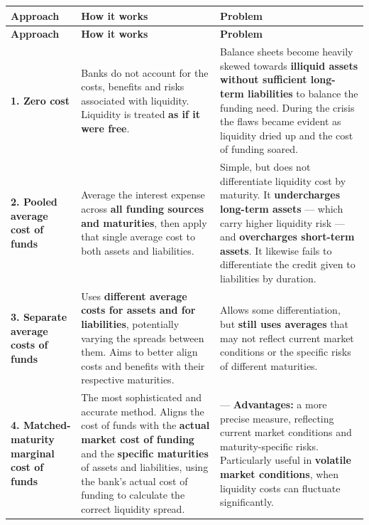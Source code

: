 \begin{center}
\scriptsize
\begin{longtable}{@{}p{3.4cm} p{5.7cm} p{5.2cm}@{}}
\toprule
\rowcolor{FRMSoft}\textbf{Approach} & \textbf{How it works} & \textbf{Problem} \\
\midrule
\endfirsthead
\toprule
\rowcolor{FRMSoft}\textbf{Approach} & \textbf{How it works} & \textbf{Problem} \\
\midrule
\endhead
\textbf{1. Zero cost} &
Banks do not account for the costs, benefits and risks associated with liquidity. Liquidity is treated \textbf{as if it were free}. &
Balance sheets become heavily skewed towards \textbf{illiquid assets without sufficient long-term liabilities} to balance the funding need. During the crisis the flaws became evident as liquidity dried up and the cost of funding soared. \\
\addlinespace
\textbf{2. Pooled average cost of funds} &
Average the interest expense across \textbf{all funding sources and maturities}, then apply that single average cost to both assets and liabilities. &
Simple, but does not differentiate liquidity cost by maturity. It \textbf{undercharges long-term assets} --- which carry higher liquidity risk --- and \textbf{overcharges short-term assets}. It likewise fails to differentiate the credit given to liabilities by duration. \\
\addlinespace
\textbf{3. Separate average costs of funds} &
Uses \textbf{different average costs for assets and for liabilities}, potentially varying the spreads between them. Aims to better align costs and benefits with their respective maturities. &
Allows some differentiation, but \textbf{still uses averages} that may not reflect current market conditions or the specific risks of different maturities. \\
\addlinespace
\textbf{4. Matched-maturity marginal cost of funds} &
The most sophisticated and accurate method. Aligns the cost of funds with the \textbf{actual market cost of funding} and the \textbf{specific maturities} of assets and liabilities, using the bank's actual cost of funding to calculate the correct liquidity spread. &
--- \textbf{Advantages:} a more precise measure, reflecting current market conditions and maturity-specific risks. Particularly useful in \textbf{volatile market conditions}, when liquidity costs can fluctuate significantly. \\
\bottomrule
\end{longtable}
\end{center}

